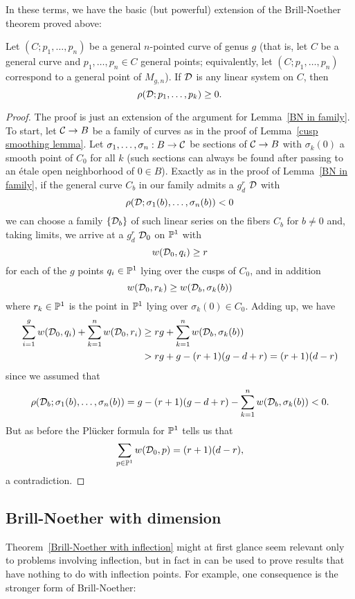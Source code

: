 In these terms, we have the basic (but powerful) extension of the Brill-Noether theorem proved above:

\begin{theorem}\label{Brill-Noether with inflection}
Let $(C;p_1,\dots,p_n)$ be a general $n$-pointed curve of genus $g$ (that is, let $C$ be a general curve and $p_1,\dots,p_n \in C$ general points; equivalently, let $(C;p_1,\dots,p_n)$ correspond to a general point of $M_{g,n}$). If $\cD$ is any linear system on $C$, then
$$
\rho(\cD; p_1,\dots,p_k) \geq 0.
$$
\end{theorem}

\begin{proof}
The proof is just an extension of the argument for Lemma~\ref{BN in family}. To start, let $\cC \to B$ be a family of curves as in the proof of Lemma~\ref{cusp smoothing lemma}. Let $\sigma_1, \dots, \sigma_n : B \to \cC$ be sections of $\cC \to B$ with $\sigma_k(0)$ a smooth point of $C_0$ for all $k$ (such sections can always be found after passing to an \'etale open neighborhood of $0 \in B$). Exactly as in the proof of Lemma~\ref{BN in family}, if the general curve $C_b$ in our family admits a $g^r_d$ $\cD$ with
$$
\rho(\cD;\sigma_1(b),\dots,\sigma_n(b)) < 0
$$
we can choose a family $\{\cD_b\}$ of such linear series on the fibers $C_b$ for $b \neq 0$ and, taking limits, we arrive at a $g^r_d$ $\cD_0$ on $\PP^1$ with
$$
w(\cD_0, q_i) \geq r
$$
for each of the $g$ points $q_i \in \PP^1$ lying over the cusps of $C_0$, and in addition
$$
w(\cD_0, r_k) \geq w(\cD_b,\sigma_k(b))
$$
where $r_k \in \PP^1$ is the point in $\PP^1$ lying over $\sigma_k(0) \in C_0$. Adding up, we have
\begin{align*}
\sum_{i=1}^g w(\cD_0, q_i) + \sum_{k=1}^n w(\cD_0, r_i) &\geq rg + \sum_{k=1}^n w(\cD_b,\sigma_k(b)) \\
&> rg + g - (r+1)(g-d+r) = (r+1)(d-r)
\end{align*}
since we assumed that 
$$
\rho(\cD_b;\sigma_1(b),\dots,\sigma_n(b)) = g - (r+1)(g-d+r) - \sum_{k=1}^n w(\cD_b,\sigma_k(b)) < 0.
$$
But as before the Pl\"ucker formula for $\PP^1$ tells us that
$$
\sum_{p \in \PP^1} w(\cD_0, p) = (r+1)(d-r),
$$
a contradiction.
\end{proof}

\subsection{Brill-Noether with dimension}

Theorem~\ref{Brill-Noether with inflection} might at first glance seem relevant only to problems involving inflection, but in fact in can be used to prove results that have nothing to do with inflection points. For example, one consequence is the stronger form of Brill-Noether:

